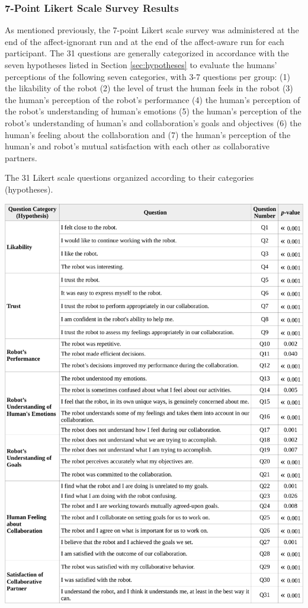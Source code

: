 \documentclass[12pt]{report}
\begin{document}
\subsubsection{7-Point Likert Scale Survey Results}
As mentioned previously, the 7-point Likert scale survey was administered at
the end of the affect-ignorant run and at the end of the affect-aware run for
each participant. The 31 questions are generally categorized in accordance
with the seven hypotheses listed in Section \ref{sec:hypotheses} to evaluate the
humans' perceptions of the following seven categories, with 3-7 questions per
group: (1) the likability of the robot (2) the level of trust the human feels in
the robot (3) the human's perception of the robot's performance (4) the human's
perception of the robot's understanding of human's emotions (5) the human's
perception of the robot's understanding of human's and collaboration's goals and
objectives (6) the human's feeling about the collaboration and (7) the human's
perception of the human's and robot's mutual satisfaction with each other as
collaborative partners. 

\begin{table}
 \centering
 \caption{The 31 Likert scale questions organized according to their
 categories (hypotheses).}
 \label{fig:31questions-table}
 \includegraphics[width=1\textwidth]{figure/31questions-table-croped.pdf}
\end{table}
\clearpage
\end{document}
